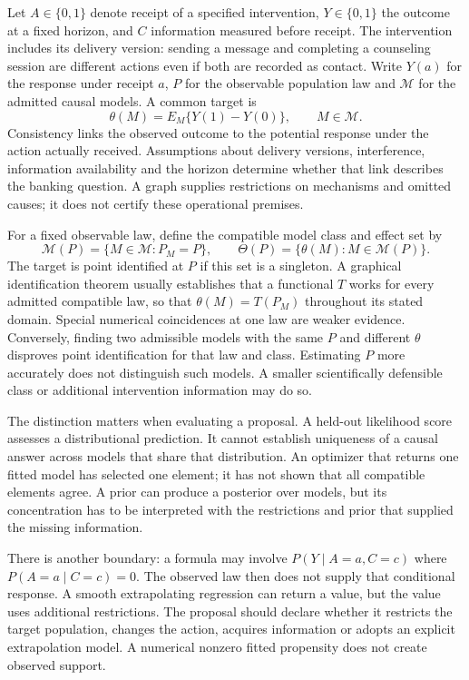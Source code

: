 Let $A\in\{0,1\}$ denote receipt of a specified intervention, $Y\in\{0,1\}$
the outcome at a fixed horizon, and $C$ information measured before receipt.
The intervention includes its delivery version: sending a message and
completing a counseling session are different actions even if both are
recorded as contact. Write $Y(a)$ for the response under receipt $a$,
$P$ for the observable population law and $\mathcal M$ for the admitted
causal models. A common target is
\[
 \theta(M)=E_M\{Y(1)-Y(0)\},\qquad M\in\mathcal M.
\]
Consistency links the observed outcome to the potential response under
the action actually received. Assumptions about delivery versions,
interference, information availability and the horizon determine whether
that link describes the banking question. A graph supplies restrictions
on mechanisms and omitted causes; it does not certify these operational
premises.~\citep{pearl2009,swig2013}

For a fixed observable law, define the compatible model class and effect set by
\[
 \mathcal M(P)=\{M\in\mathcal M:P_M=P\},\qquad
 \Theta(P)=\{\theta(M):M\in\mathcal M(P)\}.
\]
The target is point identified at $P$ if this set is a singleton. A graphical
identification theorem usually establishes that a functional $T$ works for
every admitted compatible law, so that $\theta(M)=T(P_M)$ throughout its
stated domain. Special numerical coincidences at one law are weaker evidence.
Conversely, finding two admissible models with the same $P$ and different
$\theta$ disproves point identification for that law and class. Estimating
$P$ more accurately does not distinguish such models. A smaller scientifically
defensible class or additional intervention information may
do so.~\citep{id2006,pearl2009}

The distinction matters when evaluating a proposal. A held-out likelihood
score assesses a distributional prediction. It cannot establish uniqueness
of a causal answer across models that share that distribution. An optimizer
that returns one fitted model has selected one element; it has not shown that
all compatible elements agree. A prior can produce a posterior over models,
but its concentration has to be interpreted with the restrictions and prior
that supplied the missing information.

There is another boundary: a formula may involve $P(Y\mid A=a,C=c)$ where
$P(A=a\mid C=c)=0$. The observed law then does not supply that conditional
response. A smooth extrapolating regression can return a value, but the value
uses additional restrictions. The proposal should declare whether it restricts
the target population, changes the action, acquires information or adopts
an explicit extrapolation model. A numerical nonzero fitted propensity
does not create observed support.


